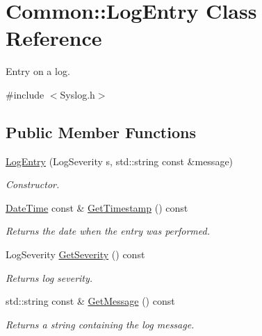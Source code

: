 \hypertarget{class_common_1_1_log_entry}{\section{Common\-:\-:Log\-Entry Class Reference}
\label{class_common_1_1_log_entry}
}


Entry on a log.  




{\ttfamily \#include $<$Syslog.\-h$>$}

\subsection*{Public Member Functions}
\begin{DoxyCompactItemize}
\item 
\hyperlink{class_common_1_1_log_entry_aea7d9e006bce770b70a2016b166facf7}{Log\-Entry} (Log\-Severity s, std\-::string const \&message)
\begin{DoxyCompactList}\small\item\em Constructor. \end{DoxyCompactList}\item 
\hypertarget{class_common_1_1_log_entry_a25542669cbc352a384874c30ca36d3e2}{\hyperlink{class_common_1_1_date_time}{Date\-Time} const \& \hyperlink{class_common_1_1_log_entry_a25542669cbc352a384874c30ca36d3e2}{Get\-Timestamp} () const }\label{class_common_1_1_log_entry_a25542669cbc352a384874c30ca36d3e2}

\begin{DoxyCompactList}\small\item\em Returns the date when the entry was performed. \end{DoxyCompactList}\item 
Log\-Severity \hyperlink{class_common_1_1_log_entry_a7a86f1c5e30447a395c0c070e76dcfcb}{Get\-Severity} () const 
\begin{DoxyCompactList}\small\item\em Returns log severity. \end{DoxyCompactList}\item 
\hypertarget{class_common_1_1_log_entry_a618b6503e831e0656986df5aea7f3d4e}{std\-::string const \& \hyperlink{class_common_1_1_log_entry_a618b6503e831e0656986df5aea7f3d4e}{Get\-Message} () const }\label{class_common_1_1_log_entry_a618b6503e831e0656986df5aea7f3d4e}

\begin{DoxyCompactList}\small\item\em Returns a string containing the log message. \end{DoxyCompactList}\end{DoxyCompactItemize}


